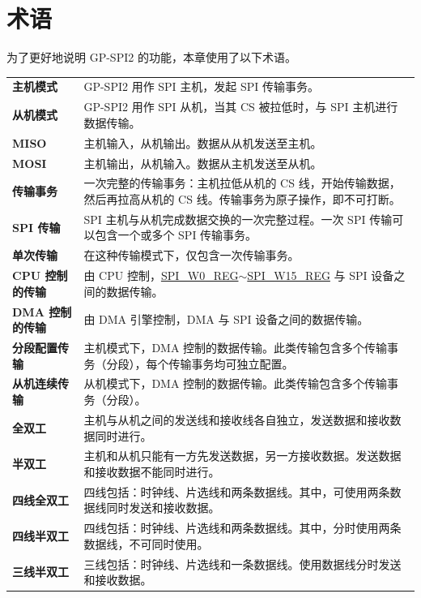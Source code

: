 \section{术语}

为了更好地说明 GP-SPI2 的功能，本章使用了以下术语。 

\begin{longtable}[c]{ R{4cm} p{10cm} }

\textbf{主机模式}     & GP-SPI2 用作 SPI 主机，发起 SPI 传输事务。\\ 
\textbf{从机模式}      & GP-SPI2 用作 SPI 从机，当其 CS 被拉低时，与 SPI 主机进行数据传输。\\
\textbf{MISO}       & 主机输入，从机输出。数据从从机发送至主机。\\
\textbf{MOSI}  & 主机输出，从机输入。数据从主机发送至从机。\\ 
\textbf{传输事务} & 一次完整的传输事务：主机拉低从机的 CS 线，开始传输数据，然后再拉高从机的 CS 线。传输事务为原子操作，即不可打断。\\
\textbf{SPI 传输} & SPI 主机与从机完成数据交换的一次完整过程。一次 SPI 传输可以包含一个或多个 SPI 传输事务。\\
\textbf{单次传输} & 在这种传输模式下，仅包含一次传输事务。\\
\textbf{CPU 控制的传输}& 由 CPU 控制，\hyperref[regdesc:SPIW0REG]{SPI\_W0\_REG}$\sim$\hyperref[regdesc:SPIW0REG]{SPI\_W15\_REG} 与 SPI 设备之间的数据传输。\\
\textbf{DMA 控制的传输}& 由 DMA 引擎控制，DMA 与 SPI 设备之间的数据传输。\\
\textbf{分段配置传输}& 主机模式下，DMA 控制的数据传输。此类传输包含多个传输事务（分段），每个传输事务均可独立配置。\\
\textbf{从机连续传输} & 从机模式下，DMA 控制的数据传输。此类传输包含多个传输事务（分段）。\\
\textbf{全双工} & 主机与从机之间的发送线和接收线各自独立，发送数据和接收数据同时进行。\\
\textbf{半双工} & 主机和从机只能有一方先发送数据，另一方接收数据。发送数据和接收数据不能同时进行。\\
\textbf{四线全双工} & 四线包括：时钟线、片选线和两条数据线。其中，可使用两条数据线同时发送和接收数据。\\
\textbf{四线半双工} & 四线包括：时钟线、片选线和两条数据线。其中，分时使用两条数据线，不可同时使用。\\
\textbf{三线半双工} & 三线包括：时钟线、片选线和一条数据线。使用数据线分时发送和接收数据。\\

\end{longtable}
